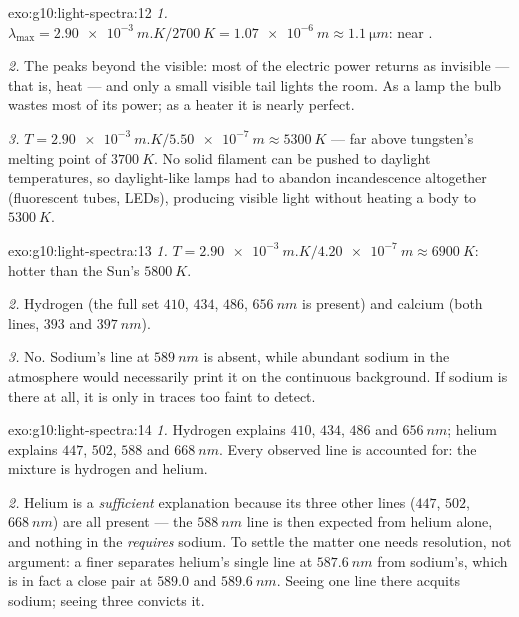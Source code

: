 \begin{solution}{exo:g10:light-spectra:12}
\emph{1.} $\lambda_{\max} = \qty{2.90e-3}{m.K} / \qty{2700}{K}
= \qty{1.07e-6}{m} \approx \qty{1.1}{\micro m}$: near .

\emph{2.} The  peaks beyond the visible: most of the electric
power returns as invisible  --- that is, heat --- and only a
small visible tail lights the room. As a lamp the bulb wastes most of its
power; as a heater it is nearly perfect.

\emph{3.} $T = \qty{2.90e-3}{m.K} / \qty{5.50e-7}{m} \approx
\qty{5300}{K}$ --- far above tungsten's melting point of
$\qty{3700}{K}$. No solid filament can be pushed to daylight
temperatures, so daylight-like lamps had to abandon incandescence
altogether (fluorescent tubes, LEDs), producing visible light without
heating a body to $\qty{5300}{K}$.
\end{solution}

\begin{solution}{exo:g10:light-spectra:13}
\emph{1.} $T = \qty{2.90e-3}{m.K} / \qty{4.20e-7}{m} \approx
\qty{6900}{K}$: hotter than the Sun's $\qty{5800}{K}$.

\emph{2.} Hydrogen (the full set $410$, $434$, $486$, $\qty{656}{nm}$ is
present) and calcium (both lines, $393$ and $\qty{397}{nm}$).

\emph{3.} No. Sodium's line at $\qty{589}{nm}$ is absent, while abundant
sodium in the atmosphere would necessarily print it on the continuous
background. If sodium is there at all, it is only in traces too faint to
detect.
\end{solution}

\begin{solution}{exo:g10:light-spectra:14}
\emph{1.} Hydrogen explains $410$, $434$, $486$ and $\qty{656}{nm}$;
helium explains $447$, $502$, $588$ and $\qty{668}{nm}$. Every observed
line is accounted for: the mixture is hydrogen and helium.

\emph{2.} Helium is a \emph{sufficient} explanation because its three
other lines ($447$, $502$, $\qty{668}{nm}$) are all present --- the
$\qty{588}{nm}$ line is then expected from helium alone, and nothing in
the  \emph{requires} sodium. To settle the matter one needs
resolution, not argument: a finer  separates helium's single
line at $\qty{587.6}{nm}$ from sodium's, which is in fact a close pair at
$589.0$ and $\qty{589.6}{nm}$. Seeing one line there acquits sodium;
seeing three convicts it.
\end{solution}

